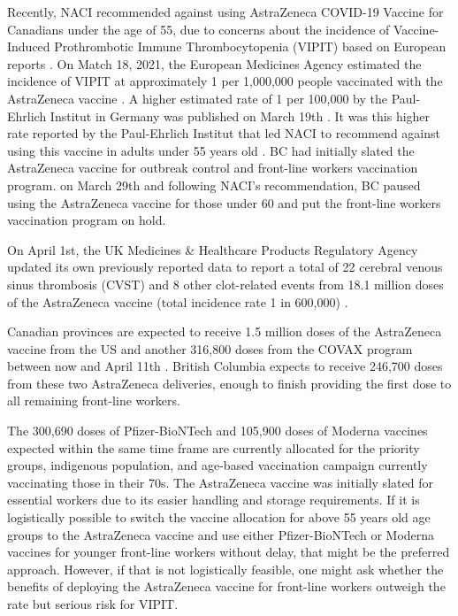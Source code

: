 \documentclass[]{interact}
\theoremstyle{plain}%
\theoremstyle{definition}
\theoremstyle{remark}
\begin{document}
Recently, NACI recommended against using AstraZeneca COVID-19 Vaccine
for Canadians under the age of 55, due to concerns about the incidence
of Vaccine-Induced Prothrombotic Immune Thrombocytopenia (VIPIT) based
on European reports \citep{naci_naci_2021}. On Match 18, 2021, the
European Medicines Agency estimated the incidence of VIPIT at
approximately 1 per 1,000,000 people vaccinated with the AstraZeneca
vaccine \citep{ema_covid-19_2021}. A higher estimated rate of 1 per
100,000 by the Paul-Ehrlich Institut in Germany was published on March
19th \citep{pei_covid-19_2021}. It was this higher rate reported by the
Paul-Ehrlich Institut that led NACI to recommend against using this
vaccine in adults under 55 years old \citep{naci_naci_2021}. BC had
initially slated the AstraZeneca vaccine for outbreak control and
front-line workers vaccination program. on March 29th and following
NACI's recommendation, BC paused using the AstraZeneca vaccine for those
under 60 and put the front-line workers vaccination program on hold.

On April 1st, the UK Medicines \& Healthcare Products Regulatory Agency
updated its own previously reported data to report a total of 22
cerebral venous sinus thrombosis (CVST) and 8 other clot-related events
from 18.1 million doses of the AstraZeneca vaccine (total incidence rate
1 in 600,000) \citep{mhra_coronavirus_2021}.

Canadian provinces are expected to receive 1.5 million doses of the
AstraZeneca vaccine from the US and another 316,800 doses from the COVAX
program between now and April 11th
\citep{government_of_canada_vaccines_2021}. British Columbia expects to
receive 246,700 doses from these two AstraZeneca deliveries, enough to
finish providing the first dose to all remaining front-line workers.

The 300,690 doses of Pfizer-BioNTech and 105,900 doses of Moderna
vaccines expected within the same time frame are currently allocated for
the priority groups, indigenous population, and age-based vaccination
campaign currently vaccinating those in their 70s. The AstraZeneca
vaccine was initially slated for essential workers due to its easier
handling and storage requirements. If it is logistically possible to
switch the vaccine allocation for above 55 years old age groups to the
AstraZeneca vaccine and use either Pfizer-BioNTech or Moderna vaccines
for younger front-line workers without delay, that might be the
preferred approach. However, if that is not logistically feasible, one
might ask whether the benefits of deploying the AstraZeneca vaccine for
front-line workers outweigh the rate but serious risk for VIPIT.
\end{document}
